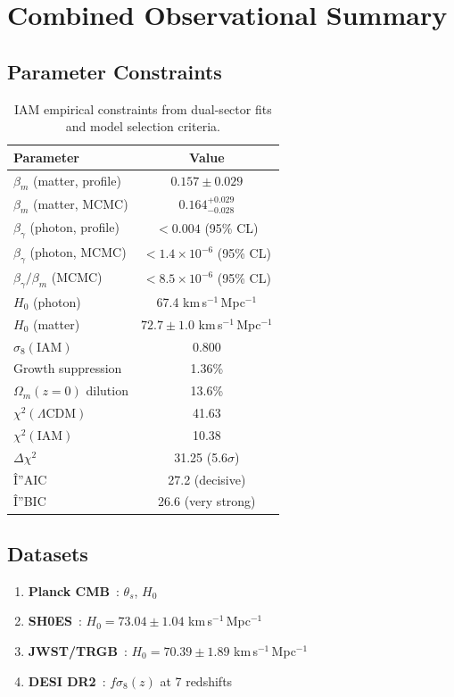 \documentclass[twocolumn,superscriptaddress,prl,amsmath,amssymb]{revtex4-2}
\begin{document}
\section{Combined Observational Summary}

\subsection{Parameter Constraints}

\begin{table}[h]
\centering
\begin{tabular}{lc}
\hline\hline
Parameter & Value \\
\hline
$\beta_m$ (matter, profile) & $0.157 \pm 0.029$ \\
$\beta_m$ (matter, MCMC) & $0.164^{+0.029}_{-0.028}$ \\
$\beta_\gamma$ (photon, profile) & $< 0.004$ (95\% CL) \\
$\beta_\gamma$ (photon, MCMC) & $< 1.4 \times 10^{-6}$ (95\% CL) \\
$\beta_\gamma/\beta_m$ (MCMC) & $< 8.5 \times 10^{-6}$ (95\% CL) \\
\hline
$H_0$ (photon) & 67.4 km\,s$^{-1}$\,Mpc$^{-1}$ \\
$H_0$ (matter) & $72.7 \pm 1.0$ km\,s$^{-1}$\,Mpc$^{-1}$ \\
\hline
$\sigma_8(\text{IAM})$ & 0.800 \\
Growth suppression & 1.36\% \\
$\Omega_m(z=0)$ dilution & 13.6\% \\
\hline
$\chi^2(\Lambda\text{CDM})$ & 41.63 \\
$\chi^2(\text{IAM})$ & 10.38 \\
$\Delta\chi^2$ & 31.25 (5.6$\sigma$) \\
\hline
Î”AIC & 27.2 (decisive) \\
Î”BIC & 26.6 (very strong) \\
\hline\hline
\end{tabular}
\caption{IAM empirical constraints from dual-sector fits and model selection criteria.}
\label{tab:results}
\end{table}

\subsection{Datasets}

\begin{enumerate}
\item \textbf{Planck CMB}~\cite{PlanckCollaboration2020}: $\theta_s$, $H_0$
\item \textbf{SH0ES}~\cite{Riess2022}: $H_0 = 73.04 \pm 1.04$ km\,s$^{-1}$\,Mpc$^{-1}$
\item \textbf{JWST/TRGB}~\cite{Freedman2024}: $H_0 = 70.39 \pm 1.89$ km\,s$^{-1}$\,Mpc$^{-1}$
\item \textbf{DESI DR2}~\cite{DESI2024}: $f\sigma_8(z)$ at 7 redshifts
\end{enumerate}
\end{document}
